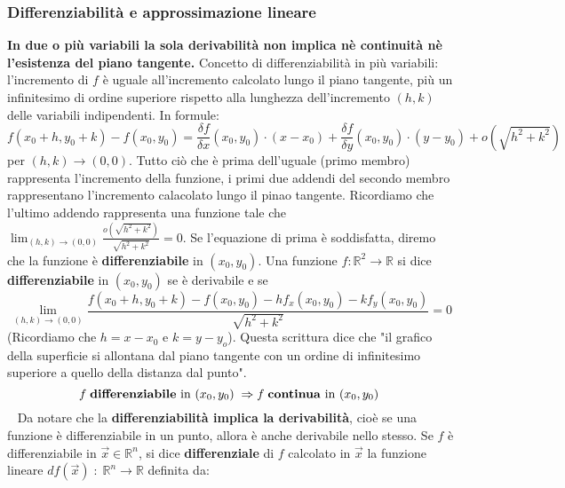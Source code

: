 \subsubsection{Differenziabilità e approssimazione lineare}
\textbf{In due o più variabili la sola derivabilità non implica nè continuità nè l'esistenza del piano tangente.}\newline
\newline
Concetto di differenziabilità in più variabili: l'incremento di $f$ è uguale all'incremento calcolato lungo il piano tangente, più un infinitesimo di ordine superiore rispetto alla lunghezza dell'incremento $(h,k)$ delle variabili indipendenti. In formule:
\[
    f(x_0 + h, y_0 + k) - f(x_0, y_0) = \frac{\delta f}{\delta x} (x_0,y_0) \cdot (x-x_0) + \frac{\delta f}{\delta y}(x_0, y_0) \cdot (y-y_0) + o(\sqrt{h^2 + k^2})
\]
per $(h,k) \rightarrow  (0,0)$.\newline
Tutto ciò che è prima dell'uguale (primo membro) rappresenta l'incremento della funzione, i primi due addendi del secondo membro rappresentano l'incremento calacolato lungo il pinao tangente. Ricordiamo che l'ultimo addendo rappresenta una funzione tale che $\lim_{(h,k)\rightarrow (0,0)}\frac{o(\sqrt{h^2 + k^2})}{\sqrt{h^2 + k^2}} = 0$.\newline
Se l'equazione di prima è soddisfatta, diremo che la funzione è \textbf{differenziabile} in $(x_0, y_0)$.\newline
\newline
Una funzione $f: \mathbb{R}^2 \rightarrow  \mathbb{R}$ si dice \textbf{differenziabile} in $(x_0, y_0)$ se è derivabile e se
\[
    \lim_{(h,k)\rightarrow (0,0)} \frac{f(x_0 + h, y_0+k)-f(x_0,y_0) - h f_x(x_0, y_0) - k f_y(x_0,y_0)}{\sqrt{h^2 + k^2}} = 0
\]
(Ricordiamo che $h = x-x_0$ e $k = y-y_o$).\newline
\newline
Questa scrittura dice che "il grafico della superficie si allontana dal piano tangente con un ordine di infinitesimo superiore a quello della distanza dal punto".
\newline
\[
    f \;\text{\textbf{differenziabile} in $(x_0, y_0)$}\; \Rightarrow f \; \text{\textbf{continua} in $(x_0,y_0)$}\;
\]
\ \newline
Da notare che la \textbf{differenziabilità implica la derivabilità}, cioè se una funzione è differenziabile in un punto, allora è anche derivabile nello stesso.\newline
\newline
Se $f$ è differenziabile in $\vec{x} \in \mathbb{R}^n$, si dice \textbf{differenziale} di $f$ calcolato in $\vec{x}$ la funzione lineare $df(\vec{x}) \;:\; \mathbb{R}^n \rightarrow  \mathbb{R}$ definita da:
